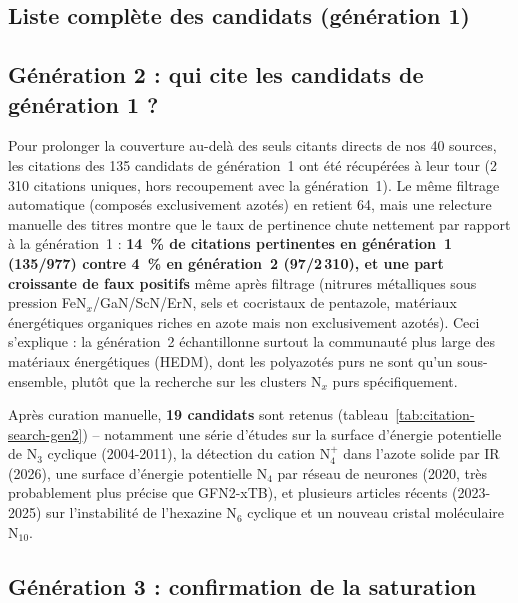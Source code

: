 \documentclass[11pt,a4paper]{article}
\begin{document}
\subsection{Liste compl\`ete des candidats (g\'en\'eration 1)}
\label{sec:citation-search-suite}



\subsection{G\'en\'eration 2 : qui cite les candidats de g\'en\'eration 1 ?}
\label{sec:citation-search-gen2}

Pour prolonger la couverture au-del\`a des seuls citants directs de nos
40 sources, les citations des 135 candidats de g\'en\'eration~1 ont
\'et\'e r\'ecup\'er\'ees \`a leur tour (2\,310 citations uniques, hors
recoupement avec la g\'en\'eration~1). Le m\^eme filtrage automatique
(compos\'es exclusivement azot\'es) en retient 64, mais une relecture
manuelle des titres montre que le taux de pertinence chute nettement par
rapport \`a la g\'en\'eration~1 : \textbf{14~\% de citations pertinentes
en g\'en\'eration~1 (135/977) contre 4~\% en g\'en\'eration~2 (97/2\,310),
et une part croissante de faux positifs} m\^eme apr\`es filtrage (nitrures
m\'etalliques sous pression FeN$_x$/GaN/ScN/ErN, sels et cocristaux de
pentazole, mat\'eriaux \'energ\'etiques organiques riches en azote mais
non exclusivement azot\'es). Ceci s'explique : la g\'en\'eration~2
\'echantillonne surtout la communaut\'e plus large des mat\'eriaux
\'energ\'etiques (HEDM), dont les polyazot\'es purs ne sont qu'un
sous-ensemble, plut\^ot que la recherche sur les clusters N$_x$ purs
sp\'ecifiquement.

Apr\`es curation manuelle, \textbf{19 candidats} sont retenus
(tableau~\ref{tab:citation-search-gen2}) -- notamment une s\'erie
d'\'etudes sur la surface d'\'energie potentielle de N$_3$ cyclique
(2004-2011), la d\'etection du cation N$_4^{+}$ dans l'azote solide par
IR (2026), une surface d'\'energie potentielle N$_4$ par r\'eseau de
neurones (2020, tr\`es probablement plus pr\'ecise que GFN2-xTB), et
plusieurs articles r\'ecents (2023-2025) sur l'instabilit\'e de
l'hexazine N$_6$ cyclique et un nouveau cristal mol\'eculaire N$_{10}$.



\subsection{G\'en\'eration 3 : confirmation de la saturation}
\label{sec:citation-search-gen3}
\end{document}
